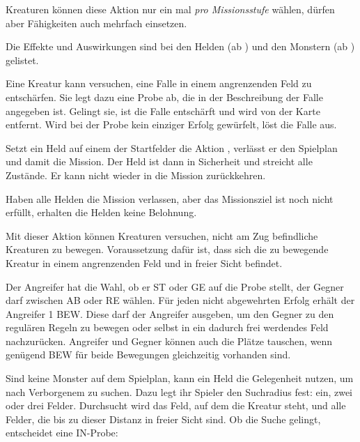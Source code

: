 {			Kreaturen können diese Aktion nur ein mal \emph{pro Missionsstufe} wählen, dürfen aber Fähigkeiten auch mehrfach einsetzen.


			\noindent
			Die Effekte und Auswirkungen sind bei den Helden (ab ) und den Monstern (ab ) gelistet.

			Eine Kreatur kann versuchen, eine Falle in einem angrenzenden Feld zu entschärfen. Sie legt dazu eine Probe ab, die in der Beschreibung der Falle angegeben ist. Gelingt sie, ist die Falle entschärft und wird von der Karte entfernt. Wird bei der Probe kein einziger Erfolg gewürfelt, löst die Falle aus.

			Setzt ein Held auf einem der Startfelder die Aktion , verlässt er den Spielplan und damit die Mission. Der Held ist dann in Sicherheit und streicht alle Zustände. Er kann nicht wieder in die Mission zurückkehren.

			Haben alle Helden die Mission verlassen, aber das Missionsziel ist noch nicht erfüllt, erhalten die Helden keine Belohnung.

			Mit dieser Aktion können Kreaturen versuchen, nicht am Zug befindliche Kreaturen zu bewegen. Voraussetzung dafür ist, dass sich die zu bewegende Kreatur in einem angrenzenden Feld und in freier Sicht befindet.

			Der Angreifer hat die Wahl, ob er ST oder GE auf die Probe stellt, der Gegner darf zwischen AB oder RE wählen. Für jeden nicht abgewehrten Erfolg erhält der Angreifer 1 BEW. Diese darf der Angreifer ausgeben, um den Gegner zu den regulären Regeln zu bewegen oder selbst in ein dadurch frei werdendes Feld nachzurücken. Angreifer und Gegner können auch die Plätze tauschen, wenn genügend BEW für beide Bewegungen gleichzeitig vorhanden sind.

			Sind keine Monster auf dem Spielplan, kann ein Held die Gelegenheit nutzen, um nach Verborgenem zu suchen. Dazu legt ihr Spieler den Suchradius fest: ein, zwei oder drei Felder. Durchsucht wird das Feld, auf dem die Kreatur steht, und alle Felder, die bis zu dieser Distanz in freier Sicht sind. Ob die Suche gelingt, entscheidet eine IN-Probe:

}
